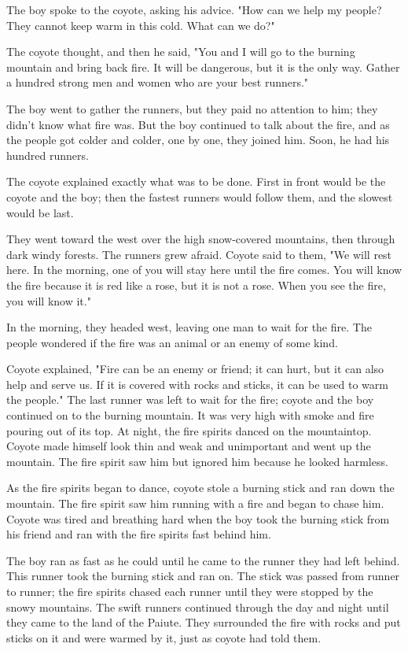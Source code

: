 The boy spoke to the coyote, asking his advice. "How can we help my people? They cannot keep warm in this cold. What can we do?"

The coyote thought, and then he said, "You and I will go to the burning mountain and bring back fire. It will be dangerous, but it is the only way. Gather a hundred strong men and women who are your best runners."

The boy went to gather the runners, but they paid no attention to him; they didn't know what fire was. But the boy continued to talk about the fire, and as the people got colder and colder, one by one, they joined him. Soon, he had his hundred runners.

The coyote explained exactly what was to be done. First in front would be the coyote and the boy; then the fastest runners would follow them, and the slowest would be last.

They went toward the west over the high snow-covered mountains, then through dark windy forests. The runners grew afraid. Coyote said to them, "We will rest here. In the morning, one of you will stay here until the fire comes. You will know the fire because it is red like a rose, but it is not a rose. When you see the fire, you will know it."

In the morning, they headed west, leaving one man to wait for the fire. The people wondered if the fire was an animal or an enemy of some kind.

Coyote explained, "Fire can be an enemy or friend; it can hurt, but it can also help and serve us. If it is covered with rocks and sticks, it can be used to warm the people." The last runner was left to wait for the fire; coyote and the boy continued on to the burning mountain. It was very high with smoke and fire pouring out of its top. At night, the fire spirits danced on the mountaintop. Coyote made himself look thin and weak and unimportant and went up the mountain. The fire spirit saw him but ignored him because he looked harmless.

As the fire spirits began to dance, coyote stole a burning stick and ran down the mountain. The fire spirit saw him running with a fire and began to chase him. Coyote was tired and breathing hard when the boy took the burning stick from his friend and ran with the fire spirits fast behind him.

The boy ran as fast as he could until he came to the runner they had left behind. This runner took the burning stick and ran on. The stick was passed from runner to runner; the fire spirits chased each runner until they were stopped by the snowy mountains. The swift runners continued through the day and night until they came to the land of the Paiute. They surrounded the fire with rocks and put sticks on it and were warmed by it, just as coyote had told them.

